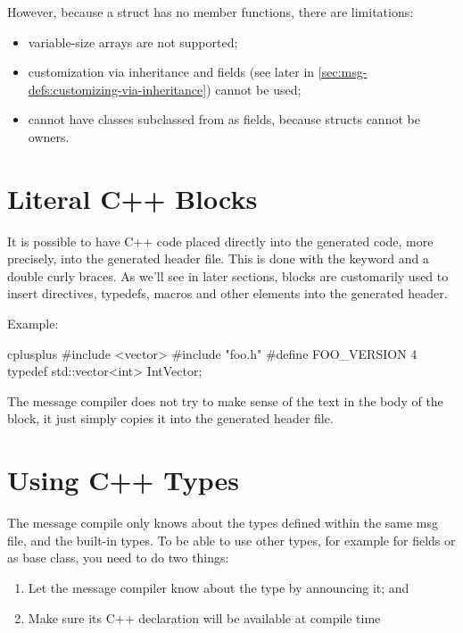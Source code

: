 However, because a struct has no member functions, there are limitations:

\begin{itemize}
   \item variable-size arrays are not supported;
   \item customization via inheritance and  fields
      (see later in \ref{sec:msg-defs:customizing-via-inheritance})
      cannot be used;
   \item cannot have classes subclassed from  as fields,
      because structs cannot be owners.
\end{itemize}



\section{Literal C++ Blocks}
\label{sec:msg-defs:cplusplus-blocks}

It is possible to have C++ code placed directly into the generated code,
more precisely, into the generated header file. This is done with the
 keyword and a double curly braces. As we'll see in
later sections,  blocks are customarily used to insert
 directives, typedefs,  macros and other
elements into the generated header.

Example:

\begin{msg}
cplusplus {{
#include <vector>
#include "foo.h"
#define FOO_VERSION 4
typedef std::vector<int> IntVector;
}}
\end{msg}

The message compiler does not try to make sense of the text in the body of
the  block, it just simply copies it into the generated
header file.


\section{Using C++ Types}
\label{sec:msg-defs:using-cpp-types}

The message compile only knows about the types defined within the same msg
file, and the built-in types. To be able to use other types, for example
for fields or as base class, you need to do two things:

\begin{enumerate}
   \item Let the message compiler know about the type by announcing it; and
   \item Make sure its C++ declaration will be available at compile time
\end{enumerate}

